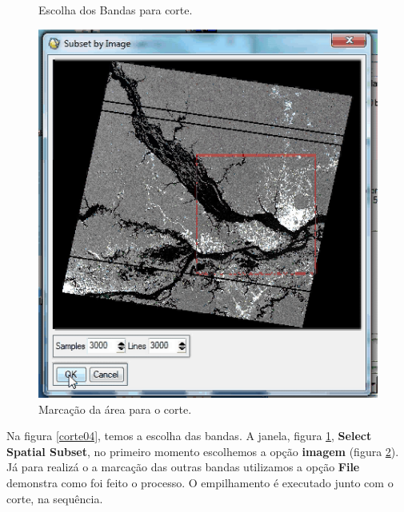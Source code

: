 \begin{itemize}
\begin{figure}[!htpb]
        \caption{Escolha dos Bandas para corte.}
        \label{corte05}
\end{figure}
\begin{figure}[!htpb]
        \centering
        \includegraphics[scale=0.5]{imagens/corte06.png}
        \caption{Marcação da área para o corte.}
        \label{corte06}
\end{figure}
\end{itemize}
\hspace{1.5cm} Na figura \ref{corte04}, temos a escolha das bandas. A janela, figura \ref{corte05}, \textbf{Select Spatial Subset}, no primeiro momento escolhemos a opção \textbf{imagem} (figura \ref{corte06}). Já para realizá o a marcação das outras bandas utilizamos a opção \textbf{File} demonstra como foi feito o processo. O empilhamento é executado junto com o corte, na sequência.